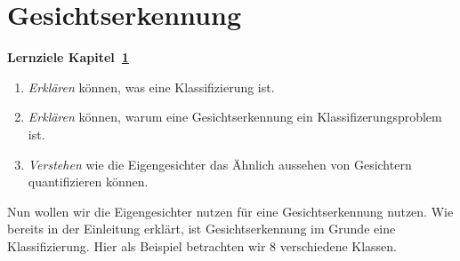 \section{Gesichtserkennung} \label{sec:recognition}
\begin{tcolorbox}
	\centerline{\textbf{Lernziele Kapitel~\ref{sec:recognition}}}
	\begin{enumerate}[leftmargin=*,label=\thesection.\arabic*]
		\item \textit{Erklären} können, was eine Klassifizierung ist.
		\item \textit{Erklären} können, warum eine Gesichtserkennung ein Klassifizerungsproblem ist.
		\item \textit{Verstehen} wie die Eigengesichter das \glqq{}Ähnlich aussehen\grqq{} von Gesichtern quantifizieren können.
	\end{enumerate}
\end{tcolorbox}
Nun wollen wir die Eigengesichter nutzen für eine Gesichtserkennung nutzen.
Wie bereits in der Einleitung erklärt, ist Gesichtserkennung im Grunde eine Klassifizierung.
Hier als Beispiel betrachten wir 8 verschiedene Klassen.
